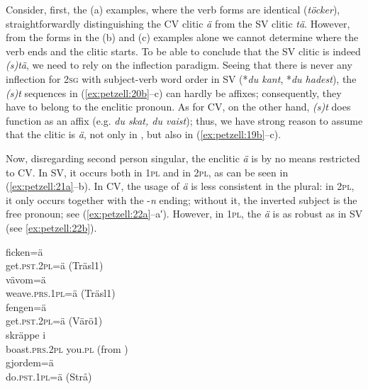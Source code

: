 \documentclass[output=paper,colorlinks,citecolor=brown,draft,draftmode]{langscibook}
\begin{document}
Consider, first, the (a) examples, where the verb forms are identical (\textit{töcker}), straightforwardly distinguishing the CV clitic \textit{ä} from the SV clitic \textit{tä}. However, from the forms in the (b) and (c) examples alone we cannot determine where the verb ends and the clitic starts. To be able to conclude that the SV clitic is indeed \textit{(s)tä}, we need to rely on the inflection paradigm. Seeing that there is never any inflection for 2\textsc{sg} with subject-verb word order in SV (*\textit{du kant}, *\textit{du hadest}), the \textit{(s)t} sequences in (\ref{ex:petzell:20b}–c) can hardly be affixes; consequently, they have to belong to the enclitic pronoun. As for CV, on the other hand, \textit{(s)t} does function as an affix (e.g. \textit{du skat, du vaist}); thus, we have strong reason to assume that the clitic is \textit{ä}, not only in , but also in (\ref{ex:petzell:19b}–c).



Now, disregarding second person singular, the enclitic \textit{ä} is by no means restricted to CV. In SV, it occurs both in 1\textsc{pl} and in 2\textsc{pl,} as can be seen in (\ref{ex:petzell:21a}–b). In CV, the usage of \textit{ä} is less consistent in the plural: in 2\textsc{pl}, it only occurs together with the -\textit{n} ending; without it, the inverted subject is the free pronoun; see (\ref{ex:petzell:22a}–a′). However, in 1\textsc{pl}, the \textit{ä} is as robust as in SV (see \ref{ex:petzell:22b}).


\ea\label{ex:petzell:21}
\ea\label{ex:petzell:21a}
\gll ficken=ä \\
    get.\textsc{pst}.2\textsc{pl}=ä (Träsl1)  \\
\ex\label{ex:petzell:21b}
\gll vävom=ä   \\
    weave.\textsc{prs}.1\textsc{pl}=ä (Träsl1)\\
\z
\ex\label{ex:petzell:22}
\ea\label{ex:petzell:22a}
\gll fengen=ä \\
    get.\textsc{pst}.2\textsc{pl}=ä (Värö1)  \\
\gll skräppe      i\\
    boast.\textsc{prs}.2\textsc{pl}   you.\textsc{pl} (from \citealt{Lindberg1927})  \\
\ex\label{ex:petzell:22b}
\gll gjordem=ä   \\
    do.\textsc{pst}.1\textsc{pl}=ä (Strå)\\
\z
\z
\end{document}
